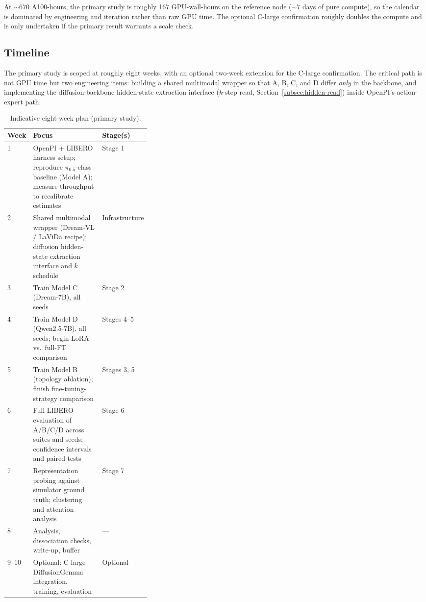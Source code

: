 \documentclass[11pt]{article}
\begin{document}
At $\sim$670 A100-hours, the primary study is roughly 167 GPU-wall-hours on the reference node ($\sim$7 days of pure compute), so the calendar is dominated by engineering and iteration rather than raw GPU time. The optional \mbox{C-large} confirmation roughly doubles the compute and is only undertaken if the primary result warrants a scale check.

\subsection{Timeline}

The primary study is scoped at roughly eight weeks, with an optional two-week extension for the \mbox{C-large} confirmation. The critical path is not GPU time but two engineering items: building a shared multimodal wrapper so that A, B, C, and D differ \emph{only} in the backbone, and implementing the diffusion-backbone hidden-state extraction interface ($k$-step read, Section~\ref{subsec:hidden-read}) inside OpenPI's action-expert path.

\begin{table}[h!]
\centering
\caption{Indicative eight-week plan (primary study).}
\begin{tabularx}{\linewidth}{p{0.10\linewidth} X p{0.24\linewidth}}
\toprule
Week & Focus & Stage(s) \\
\midrule
1 & OpenPI + LIBERO harness setup; reproduce $\pi_{0.5}$-class baseline (Model A); measure throughput to recalibrate estimates & Stage 1 \\
2 & Shared multimodal wrapper (Dream-VL / LaViDa recipe); diffusion hidden-state extraction interface and $k$ schedule & Infrastructure \\
3 & Train Model C (Dream-7B), all seeds & Stage 2 \\
4 & Train Model D (Qwen2.5-7B), all seeds; begin LoRA vs.\ full-FT comparison & Stages 4--5 \\
5 & Train Model B (topology ablation); finish fine-tuning-strategy comparison & Stages 3, 5 \\
6 & Full LIBERO evaluation of A/B/C/D across suites and seeds; confidence intervals and paired tests & Stage 6 \\
7 & Representation probing against simulator ground truth; clustering and attention analysis & Stage 7 \\
8 & Analysis, dissociation checks, write-up, buffer & --- \\
\midrule
9--10 & Optional: \mbox{C-large} DiffusionGemma integration, training, evaluation & Optional \\
\bottomrule
\end{tabularx}
\end{table}
\end{document}
